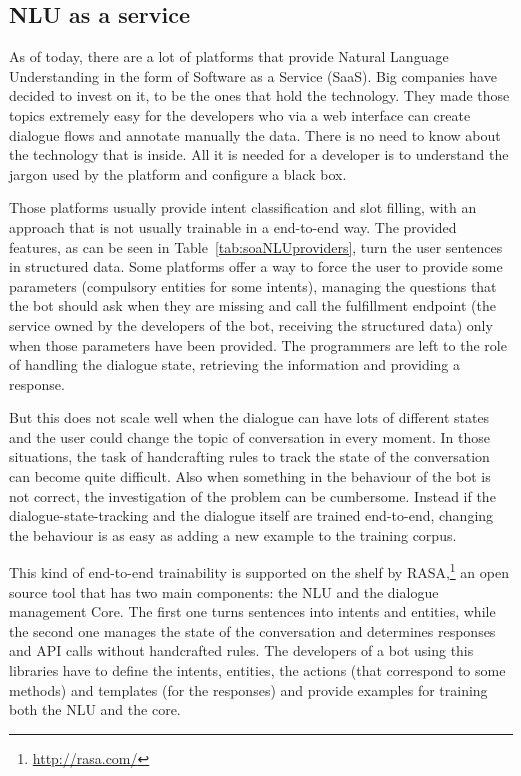\subsection{NLU as a service}
As of today, there are a lot of platforms that provide Natural Language Understanding in the form of Software as a Service (SaaS). Big companies have decided to invest on it, to be the ones that hold the technology. They made those topics extremely easy for the developers who via a web interface can create dialogue flows and annotate manually the data. There is no need to know about the technology that is inside. All it is needed for a developer is to understand the jargon used by the platform and configure a black box.



Those platforms usually provide intent classification and slot filling, with an approach that is not usually trainable in a end-to-end way. The provided features, as can be seen in Table~\ref{tab:soaNLUproviders}, turn the user sentences in structured data. Some platforms offer a way to force the user to provide some parameters (compulsory entities for some intents), managing the questions that the bot should ask when they are missing and call the fulfillment endpoint (the service owned by the developers of the bot, receiving the structured data) only when those parameters have been provided. The programmers are left to the role of handling the dialogue state, retrieving the information and providing a response.

But this does not scale well when the dialogue can have lots of different states and the user could change the topic of conversation in every moment. In those situations, the task of handcrafting rules to track the state of the conversation can become quite difficult. Also when something in the behaviour of the bot is not correct, the investigation of the problem can be cumbersome. Instead if the dialogue-state-tracking and the dialogue itself are trained end-to-end, changing the behaviour is as easy as adding a new example to the training corpus.

This kind of end-to-end trainability is supported on the shelf by RASA,\footnote{\url{http://rasa.com/}} an open source tool that has two main components: the NLU and the dialogue management Core. The first one turns sentences into intents and entities, while the second one manages the state of the conversation and determines responses and API calls without handcrafted rules. The developers of a bot using this libraries have to define the intents, entities, the actions (that correspond to some methods) and templates (for the responses) and provide examples for training both the NLU and the core.

